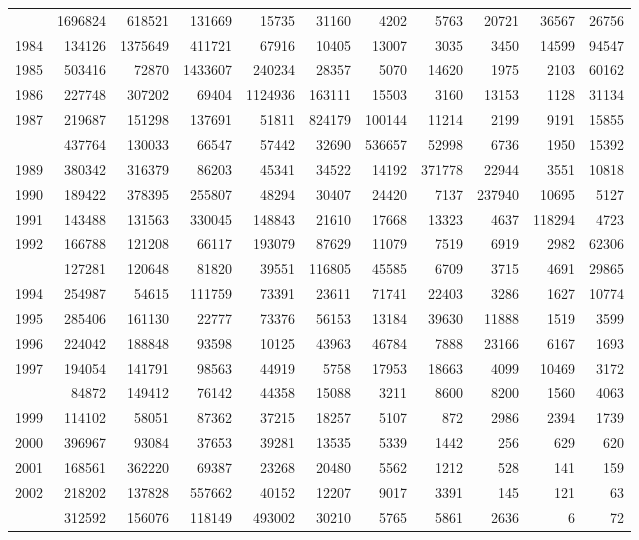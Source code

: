 \documentclass[
]{article}
\begin{document}
\begin{longtable}[t]{lrrrrrrrrrr}
\addlinespace
1983 & 1696824 & 618521 & 131669 & 15735 & 31160 & 4202 & 5763 & 20721 & 36567 & 26756\\
1984 & 134126 & 1375649 & 411721 & 67916 & 10405 & 13007 & 3035 & 3450 & 14599 & 94547\\
1985 & 503416 & 72870 & 1433607 & 240234 & 28357 & 5070 & 14620 & 1975 & 2103 & 60162\\
1986 & 227748 & 307202 & 69404 & 1124936 & 163111 & 15503 & 3160 & 13153 & 1128 & 31134\\
1987 & 219687 & 151298 & 137691 & 51811 & 824179 & 100144 & 11214 & 2199 & 9191 & 15855\\
\addlinespace
1988 & 437764 & 130033 & 66547 & 57442 & 32690 & 536657 & 52998 & 6736 & 1950 & 15392\\
1989 & 380342 & 316379 & 86203 & 45341 & 34522 & 14192 & 371778 & 22944 & 3551 & 10818\\
1990 & 189422 & 378395 & 255807 & 48294 & 30407 & 24420 & 7137 & 237940 & 10695 & 5127\\
1991 & 143488 & 131563 & 330045 & 148843 & 21610 & 17668 & 13323 & 4637 & 118294 & 4723\\
1992 & 166788 & 121208 & 66117 & 193079 & 87629 & 11079 & 7519 & 6919 & 2982 & 62306\\
\addlinespace
1993 & 127281 & 120648 & 81820 & 39551 & 116805 & 45585 & 6709 & 3715 & 4691 & 29865\\
1994 & 254987 & 54615 & 111759 & 73391 & 23611 & 71741 & 22403 & 3286 & 1627 & 10774\\
1995 & 285406 & 161130 & 22777 & 73376 & 56153 & 13184 & 39630 & 11888 & 1519 & 3599\\
1996 & 224042 & 188848 & 93598 & 10125 & 43963 & 46784 & 7888 & 23166 & 6167 & 1693\\
1997 & 194054 & 141791 & 98563 & 44919 & 5758 & 17953 & 18663 & 4099 & 10469 & 3172\\
\addlinespace
1998 & 84872 & 149412 & 76142 & 44358 & 15088 & 3211 & 8600 & 8200 & 1560 & 4063\\
1999 & 114102 & 58051 & 87362 & 37215 & 18257 & 5107 & 872 & 2986 & 2394 & 1739\\
2000 & 396967 & 93084 & 37653 & 39281 & 13535 & 5339 & 1442 & 256 & 629 & 620\\
2001 & 168561 & 362220 & 69387 & 23268 & 20480 & 5562 & 1212 & 528 & 141 & 159\\
2002 & 218202 & 137828 & 557662 & 40152 & 12207 & 9017 & 3391 & 145 & 121 & 63\\
\addlinespace
2003 & 312592 & 156076 & 118149 & 493002 & 30210 & 5765 & 5861 & 2636 & 6 & 72\\

\end{longtable}
\end{document}
